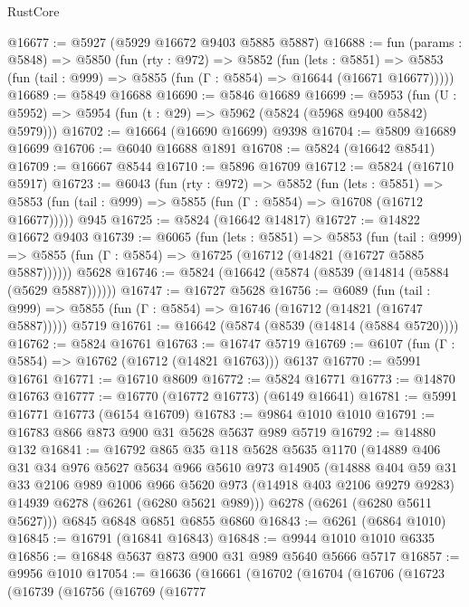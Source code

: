 \begin{lexlean}{RustCore}
\begin{coremodule}
@16677 := @5927 (@5929 @16672 @9403 @5885 @5887)
@16688 := fun (params : @5848) =>
  @5850
    (fun (rty : @972) =>
    @5852
      (fun (lets : @5851) =>
      @5853 (fun (tail : @999) => @5855 (fun (Γ : @5854) => @16644 (@16671 @16677)))))
@16689 := @5849 @16688
@16690 := @5846 @16689
@16699 := @5953
    (fun (U : @5952) => @5954 (fun (t : @29) => @5962 (@5824 (@5968 @9400 @5842) @5979)))
@16702 := @16664 (@16690 @16699) @9398
@16704 := @5809 @16689 @16699
@16706 := @6040 @16688 @1891
@16708 := @5824 (@16642 @8541)
@16709 := @16667 @8544
@16710 := @5896 @16709
@16712 := @5824 (@16710 @5917)
@16723 := @6043
    (fun (rty : @972) =>
    @5852
      (fun (lets : @5851) =>
      @5853 (fun (tail : @999) => @5855 (fun (Γ : @5854) => @16708 (@16712 @16677)))))
    @945
@16725 := @5824 (@16642 @14817)
@16727 := @14822 @16672 @9403
@16739 := @6065
    (fun (lets : @5851) =>
    @5853
      (fun (tail : @999) =>
      @5855 (fun (Γ : @5854) => @16725 (@16712 (@14821 (@16727 @5885 @5887))))))
    @5628
@16746 := @5824 (@16642 (@5874 (@8539 (@14814 (@5884 (@5629 @5887))))))
@16747 := @16727 @5628
@16756 := @6089
    (fun (tail : @999) => @5855 (fun (Γ : @5854) => @16746 (@16712 (@14821 (@16747 @5887)))))
    @5719
@16761 := @16642 (@5874 (@8539 (@14814 (@5884 @5720))))
@16762 := @5824 @16761
@16763 := @16747 @5719
@16769 := @6107 (fun (Γ : @5854) => @16762 (@16712 (@14821 @16763))) @6137
@16770 := @5991 @16761
@16771 := @16710 @8609
@16772 := @5824 @16771
@16773 := @14870 @16763
@16777 := @16770 (@16772 @16773) (@6149 @16641)
@16781 := @5991 @16771 @16773 (@6154 @16709)
@16783 := @9864 @1010 @1010
@16791 := @16783 @866 @873 @900 @31 @5628 @5637 @989 @5719
@16792 := @14880 @132
@16841 := @16792
    @865
    @35
    @118
    @5628
    @5635
    @1170
    (@14889
      @406
      @31
      @34
      @976
      @5627
      @5634
      @966
      @5610
      @973
      @14905
      (@14888
        @404
        @59
        @31
        @33
        @2106
        @989
        @1006
        @966
        @5620
        @973
        (@14918 @403 @2106 @9279 @9283)
        @14939
        @6278
        (@6261 (@6280 @5621 @989)))
      @6278
      (@6261 (@6280 @5611 @5627)))
    @6845
    @6848
    @6851
    @6855
    @6860
@16843 := @6261 (@6864 @1010)
@16845 := @16791 (@16841 @16843)
@16848 := @9944 @1010 @1010 @6335
@16856 := @16848 @5637 @873 @900 @31 @989 @5640 @5666 @5717
@16857 := @9956 @1010
@17054 := @16636
    (@16661
      (@16702
        (@16704
          (@16706
            (@16723
              (@16739
                (@16756
                  (@16769
                    (@16777

\end{coremodule}
\end{lexlean}

